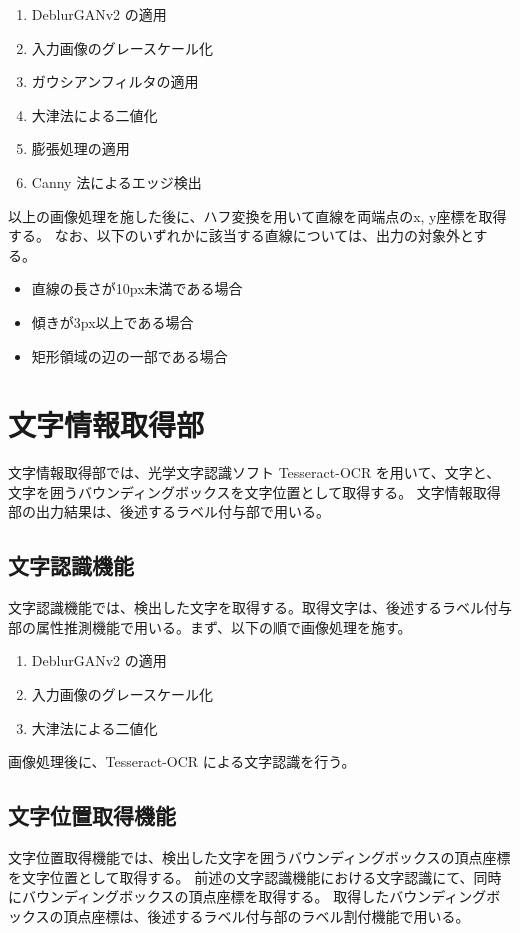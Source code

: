 \begin{enumerate}[label=(\arabic*)]
    \item DeblurGANv2 の適用
    \item 入力画像のグレースケール化
    \item ガウシアンフィルタの適用
    \item 大津法による二値化
    \item 膨張処理の適用
    \item Canny 法によるエッジ検出
\end{enumerate}

以上の画像処理を施した後に、ハフ変換を用いて直線を両端点のx, y座標を取得する。
なお、以下のいずれかに該当する直線については、出力の対象外とする。

\begin{itemize}
    \item 直線の長さが10px未満である場合
    \item 傾きが3px以上である場合
    \item 矩形領域の辺の一部である場合
\end{itemize}



\section{文字情報取得部}\label{sec:OCR_part}
文字情報取得部では、光学文字認識ソフト Tesseract-OCR を用いて、文字と、文字を囲うバウンディングボックスを文字位置として取得する。
文字情報取得部の出力結果は、後述するラベル付与部で用いる。

\subsection{文字認識機能}\label{subsec:char_recognition_feature}
文字認識機能では、検出した文字を取得する。取得文字は、後述するラベル付与部の属性推測機能で用いる。まず、以下の順で画像処理を施す。

\begin{enumerate}[label=(\arabic*)]
    \item DeblurGANv2 の適用
    \item 入力画像のグレースケール化
    \item 大津法による二値化
\end{enumerate}

画像処理後に、Tesseract-OCR による文字認識を行う。

\subsection{文字位置取得機能}\label{subsec:char_position_obtainment_featre}
文字位置取得機能では、検出した文字を囲うバウンディングボックスの頂点座標を文字位置として取得する。
前述の文字認識機能における文字認識にて、同時にバウンディングボックスの頂点座標を取得する。
取得したバウンディングボックスの頂点座標は、後述するラベル付与部のラベル割付機能で用いる。


